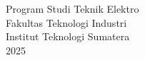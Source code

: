 \documentclass{article}
\begin{document}
{\LARGE  Program Studi Teknik Elektro \\
Fakultas Teknologi Industri \\ Institut Teknologi Sumatera \\
2025

\par}
\vspace{0.5cm}
\vfill %



\vspace{0.5cm} %

\end{document}
